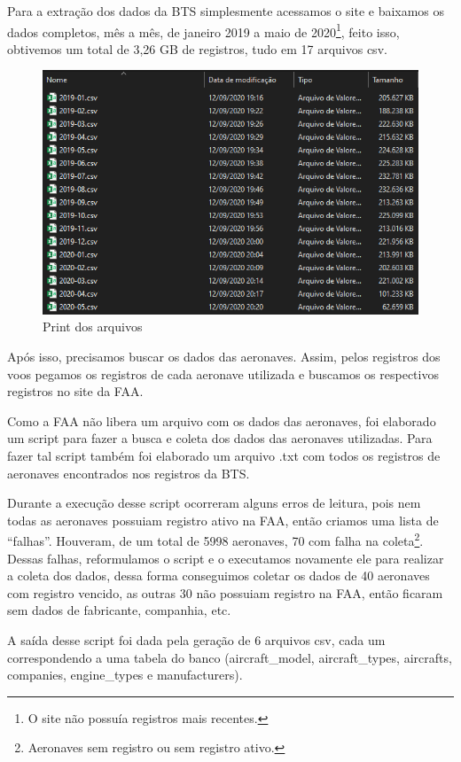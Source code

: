 \documentclass{article}
\begin{document}
Para a extração dos dados da BTS simplesmente acessamos o site e baixamos os dados completos, mês a mês, de janeiro 2019 a maio de 2020\footnote{O site não possuía registros mais recentes.}, feito isso, obtivemos um total de 3,26 GB de registros, tudo em 17 arquivos csv.
\begin{figure}[H]
    \centering
    \includegraphics[scale = 0.5]{Imagens/Arquivos.png}
    \caption{Print dos arquivos}
    \label{fig: print}
\end{figure}

Após isso, precisamos buscar os dados das aeronaves. Assim, pelos registros dos voos pegamos os registros de cada aeronave utilizada e buscamos os respectivos registros no site da FAA.

Como a FAA não libera um arquivo com os dados das aeronaves, foi elaborado um script para fazer a busca e coleta dos dados das aeronaves utilizadas. Para fazer tal script também foi elaborado um arquivo .txt com todos os registros de aeronaves encontrados nos registros da BTS.

Durante a execução desse script ocorreram alguns erros de leitura, pois nem todas as aeronaves possuiam registro ativo na FAA, então criamos uma lista de ``falhas''. Houveram, de um total de 5998 aeronaves, 70 com falha na coleta\footnote{Aeronaves sem registro ou sem registro ativo.}. Dessas falhas, reformulamos o script e o executamos novamente ele para realizar a coleta dos dados, dessa forma conseguimos coletar os dados de 40 aeronaves com registro vencido, as outras 30 não possuiam registro na FAA, então ficaram sem dados de fabricante, companhia, etc.

A saída desse script foi dada pela geração de 6 arquivos csv, cada um correspondendo a uma tabela do banco (aircraft\_model, aircraft\_types, aircrafts, companies, engine\_types e manufacturers).
\end{document}
